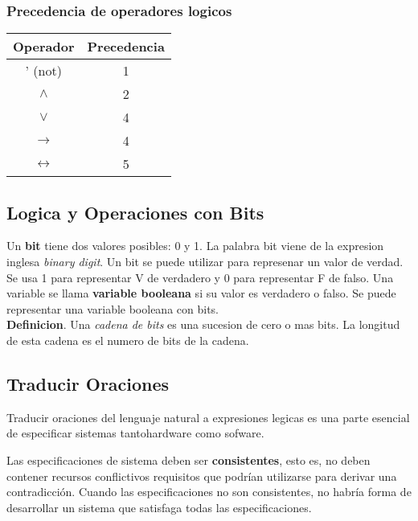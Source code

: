 \documentclass[]{article}
\begin{document}
\subsubsection*{Precedencia de operadores logicos}\label{sec:precedenda}

\begin{table}[H]
	\begin{center}
		\label{tab:precedencia}
		\begin{tabular}{c|c}
		Operador & Precedencia \\
		\hline
		' (not) & 1 \\
		$\wedge$ & 2 \\
		$\vee$ & 4 \\
		$\rightarrow$ & 4 \\
		$\leftrightarrow$ & 5 \\
		\end{tabular}
	\end{center}
\end{table}

\subsection*{Logica y Operaciones con Bits}\label{sec:operaciones-bits}

Un \textbf{bit} tiene dos valores posibles: 0 y 1. La palabra bit viene de la expresion inglesa \textit{binary digit}. Un bit se puede utilizar para represenar un valor de verdad. Se usa 1 para representar V de verdadero y 0 para representar F de falso. Una variable se llama \textbf{variable booleana} si su valor es verdadero o falso. Se puede representar una variable booleana con bits.\\

\textbf{Definicion}. Una \textit{cadena de bits} es una sucesion de cero o mas bits. La longitud de esta cadena es el numero de bits de la cadena.

\subsection*{Traducir Oraciones}

Traducir oraciones del lenguaje natural a expresiones legicas es una parte esencial de especificar sistemas tantohardware como sofware.

Las especificaciones de sistema deben ser \textbf{consistentes}, esto es, no deben contener recursos conflictivos requisitos que podrían utilizarse para derivar una contradicción. Cuando las especificaciones no son consistentes, no habría forma de desarrollar un sistema que satisfaga todas las especificaciones.
\end{document}
